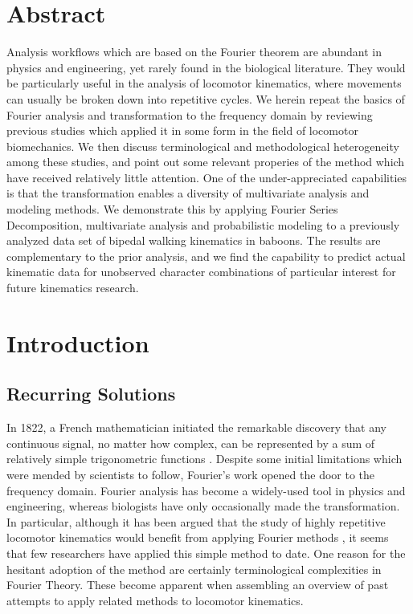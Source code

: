 
\section{Abstract}
\label{sec:org3ea498f}
Analysis workflows which are based on the Fourier theorem are abundant in physics and engineering, yet rarely found in the biological literature.
They would be particularly useful in the analysis of locomotor kinematics, where movements can usually be broken down into repetitive cycles.
We herein repeat the basics of Fourier analysis and transformation to the frequency domain by reviewing previous studies which applied it in some form in the field of locomotor biomechanics.
We then discuss terminological and methodological heterogeneity among these studies, and point out some relevant properies of the method which have received relatively little attention.
One of the under-appreciated capabilities is that the transformation enables a diversity of multivariate analysis and modeling methods.
We demonstrate this by applying Fourier Series Decomposition, multivariate analysis and probabilistic modeling to a previously analyzed data set of bipedal walking kinematics in baboons.
The results are complementary to the prior analysis, and we find the capability to predict actual kinematic data for unobserved character combinations of particular interest for future kinematics research.


\FloatBarrier\clearpage
\section{Introduction}
\label{intro}

\subsection{Recurring Solutions}
\label{sec:org10ede19}
In 1822, a French mathematician initiated the remarkable discovery that any continuous signal, no matter how complex, can be represented by a sum of relatively simple trigonometric functions \citep{Fourier1822}.
Despite some initial limitations which were mended by scientists to follow, Fourier's work opened the door to the frequency domain.
Fourier analysis has become a widely-used tool in physics and engineering, whereas biologists have only occasionally made the transformation.
In particular, although it has been argued that the study of highly repetitive locomotor kinematics would benefit from applying Fourier methods \citep{Schneider1983,Pike2002,Skejo2021,Webb2007,Mielke2019}, it seems that few researchers have applied this simple method to date.
One reason for the hesitant adoption of the method are certainly terminological complexities in Fourier Theory.
These become apparent when assembling an overview of past attempts to apply related methods to locomotor kinematics.


